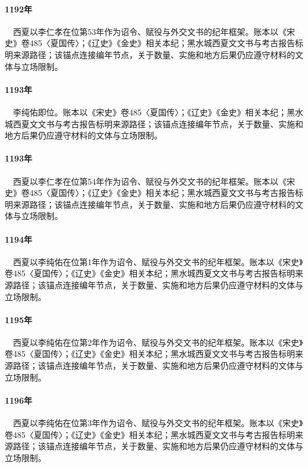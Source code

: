 \paragraph{1192年}　西夏以李仁孝在位第53年作为诏令、赋役与外交文书的纪年框架。账本以《宋史》卷485〈夏国传〉；《辽史》《金史》相关本纪；黑水城西夏文文书与考古报告标明来源路径；该锚点连接编年节点，关于数量、实施和地方后果仍应遵守材料的文体与立场限制。

\paragraph{1193年}　李纯佑即位。账本以《宋史》卷485〈夏国传〉；《辽史》《金史》相关本纪；黑水城西夏文文书与考古报告标明来源路径；该锚点连接编年节点，关于数量、实施和地方后果仍应遵守材料的文体与立场限制。

\paragraph{1193年}　西夏以李仁孝在位第54年作为诏令、赋役与外交文书的纪年框架。账本以《宋史》卷485〈夏国传〉；《辽史》《金史》相关本纪；黑水城西夏文文书与考古报告标明来源路径；该锚点连接编年节点，关于数量、实施和地方后果仍应遵守材料的文体与立场限制。

\paragraph{1194年}　西夏以李纯佑在位第1年作为诏令、赋役与外交文书的纪年框架。账本以《宋史》卷485〈夏国传〉；《辽史》《金史》相关本纪；黑水城西夏文文书与考古报告标明来源路径；该锚点连接编年节点，关于数量、实施和地方后果仍应遵守材料的文体与立场限制。

\paragraph{1195年}　西夏以李纯佑在位第2年作为诏令、赋役与外交文书的纪年框架。账本以《宋史》卷485〈夏国传〉；《辽史》《金史》相关本纪；黑水城西夏文文书与考古报告标明来源路径；该锚点连接编年节点，关于数量、实施和地方后果仍应遵守材料的文体与立场限制。

\paragraph{1196年}　西夏以李纯佑在位第3年作为诏令、赋役与外交文书的纪年框架。账本以《宋史》卷485〈夏国传〉；《辽史》《金史》相关本纪；黑水城西夏文文书与考古报告标明来源路径；该锚点连接编年节点，关于数量、实施和地方后果仍应遵守材料的文体与立场限制。

